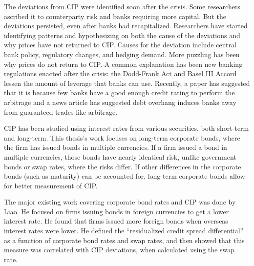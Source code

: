 


The deviations from CIP were identified soon after the crisis.  Some researchers ascribed it to counterparty risk and banks requiring more capital.\cite{Coffey2009}  But the deviations persisted, even after banks had recapitalized.  Researchers have started identifying patterns and hypothesizing on both the cause of the deviations and why prices have not returned to CIP.  Causes for the deviation include central bank policy\cite{Du2017}, regulatory changes\cite{Liao2016}, and hedging demand\cite{Borio2016}.  More puzzling has been why prices do not return to CIP.  A common explanation has been new banking regulations enacted after the crisis: the Dodd-Frank Act and Basel III Accord lessen the amount of leverage that banks can use.\cite{Du2017,Liao2016,Borio2016}  Recently, a paper\cite{Rime2017} has suggested that it is because few banks have a good enough credit rating to perform the arbitrage and a news article\cite{Duffie2017} has suggested debt overhang induces banks away from guaranteed trades like arbitrage.


CIP has been studied using interest rates from various securities, both short-term and long-term.  This thesis's work focuses on long-term corporate bonds, where the firm has issued bonds in multiple currencies.  If a firm issued a bond in multiple currencies, those bonds have nearly identical risk, unlike government bonds or swap rates, where the risks differ.  If other differences in the corporate bonds (such as maturity) can be accounted for, long-term corporate bonds allow for better measurement of CIP.

The major existing work covering corporate bond rates and CIP was done by Liao\cite{Liao2016}.  He focused on firms issuing bonds in foreign currencies to get a lower interest rate.  He found that firms issued more foreign bonds when overseas interest rates were lower.  He defined the ``residualized credit spread differential'' as a function of corporate bond rates and swap rates, and then showed that this measure was correlated with CIP deviations, when calculated using the swap rate.  

